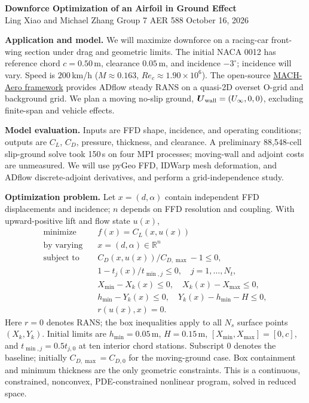 \documentclass[11pt,letterpaper]{article}
\begin{document}
\begin{center}
{\large\bfseries Downforce Optimization of an Airfoil in Ground Effect}\\[3pt]
Ling Xiao and Michael Zhang \quad Group 7 \quad AER 588 \quad October 16, 2026
\end{center}
\vspace{-7pt}

\textbf{Application and model.}
We will maximize downforce on a racing-car front-wing section under drag and geometric limits. The initial NACA 0012 has reference chord $c=0.50$\,m, clearance $0.05$\,m, and incidence $-3^\circ$; incidence will vary. Speed is $200$\,km/h ($M\approx0.163$, $Re_c\approx1.90\times10^6$). The open-source \href{https://mdolab-mach-aero.readthedocs-hosted.com/}{MACH-Aero framework} provides ADflow steady RANS on a quasi-2D overset O-grid and background grid. We plan a moving no-slip ground, $\boldsymbol{U}_{\rm wall}=(U_\infty,0,0)$, excluding finite-span and vehicle effects.

\textbf{Model evaluation.}
Inputs are FFD shape, incidence, and operating conditions; outputs are $C_L$, $C_D$, pressure, thickness, and clearance. A preliminary 88,548-cell slip-ground solve took 150\,s on four MPI processes; moving-wall and adjoint costs are unmeasured. We will use pyGeo FFD, IDWarp mesh deformation, and ADflow discrete-adjoint derivatives, and perform a grid-independence study.

\textbf{Optimization problem.}
Let $x=(d,\alpha)$ contain independent FFD displacements and incidence; $n$ depends on FFD resolution and coupling. With upward-positive lift and flow state $u(x)$,
\[
\begin{aligned}
\text{minimize}\quad & f(x)=C_L(x,u(x)) \\
\text{by varying}\quad & x=(d,\alpha)\in\mathbb R^n \\
\text{subject to}\quad & C_D(x,u(x))/C_{D,\max}-1\le0, \\
& 1-t_j(x)/t_{\min,j}\le0,\quad j=1,\ldots,N_t, \\
& X_{\min}-X_k(x)\le0,\quad X_k(x)-X_{\max}\le0, \\
& h_{\min}-Y_k(x)\le0,\quad Y_k(x)-h_{\min}-H\le0, \\
& r(u(x),x)=0.
\end{aligned}
\]
Here $r=0$ denotes RANS; the box inequalities apply to all $N_s$ surface points $(X_k,Y_k)$. Initial limits are $h_{\min}=0.05$\,m, $H=0.15$\,m, $[X_{\min},X_{\max}]=[0,c]$, and $t_{\min,j}=0.5t_{j,0}$ at ten interior chord stations. Subscript 0 denotes the baseline; initially $C_{D,\max}=C_{D,0}$ for the moving-ground case. Box containment and minimum thickness are the only geometric constraints. This is a continuous, constrained, nonconvex, PDE-constrained nonlinear program, solved in reduced space.
\end{document}
